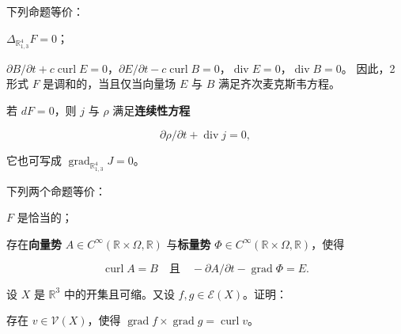 \begin{exercises}
\begin{items}
\item

下列命题等价：

\begin{subitems}
\item

$ \Delta_{\mathbb{R}^{4}_{1,3}}F = 0 $；

\item

$ \partial B/\partial t + c\operatorname{curl}E = 0 $，$ \partial E/\partial t - c\operatorname{curl}B = 0 $，$ \operatorname{div}E = 0 $，$ \operatorname{div}B = 0 $。
因此，2 形式 $ F $ 是调和的，当且仅当向量场 $ E $ 与 $ B $ 满足齐次麦克斯韦方程。

\end{subitems}

\item

若 $ dF = 0 $，则 $ j $ 与 $ \rho $ 满足\textbf{连续性方程}

\[
\partial\rho/\partial t + \operatorname{div}j = 0 ,
\]

它也可写成 $ \operatorname{grad}_{\mathbb{R}^{4}_{1,3}}J = 0 $。

\item

下列两个命题等价：

\end{items}

\begin{subitems}
\item

$ F $ 是恰当的；

\item

存在\textbf{向量势} $ A \in C^{\infty}(\mathbb{R} \times \Omega, \mathbb{R}) $ 与\textbf{标量势} $ \Phi \in C^{\infty}(\mathbb{R} \times \Omega, \mathbb{R}) $，使得

\[
\operatorname{curl}A = B \quad \text{且} \quad -\partial A/\partial t - \operatorname{grad}\Phi = E .
\]
\end{subitems}

\item

设 $ X $ 是 $ \mathbb{R}^{3} $ 中的开集且可缩。又设 $ f, g \in \mathcal{E}(X) $。证明：

\begin{subitems}
\item

存在 $ v \in \mathcal{V}(X) $，使得 $ \operatorname{grad}f \times \operatorname{grad}g = \operatorname{curl}v $。


\end{subitems}
\end{exercises}
